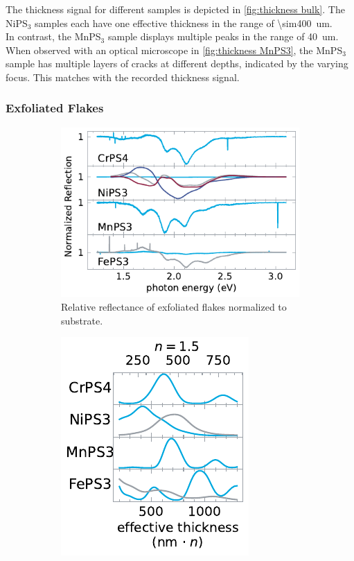 \documentclass[
	oneside,
	parskip=half,
	a4paper,
]{scrbook}
\begin{document}
The thickness signal for  different samples is depicted in \autoref{fig:thickness bulk}.
The NiPS$_3$ samples each have one effective thickness in the range of \SI{\sim400}{um}.\\
In contrast, the MnPS$_3$ sample displays multiple peaks in the range of \SI{40}{um}.
When observed with an optical microscope in \autoref{fig:thickness MnPS3}, the MnPS$_3$ sample has multiple layers of cracks at different depths, indicated by the varying focus.
This matches with the recorded thickness signal.

\subsubsection*{Exfoliated Flakes}
\begin{figure}
	\centering
	\begin{subfigure}[c]{3.5in}
		\centering
		\includegraphics{../figures/2024-04-10 normalized reflection spectra.pdf}
		\caption{Relative reflectance of exfoliated flakes normalized to substrate.}
		\label{fig:reflection flakes}
	\end{subfigure}
	\begin{subfigure}[c]{2in}
		\centering
		\includegraphics{../figures/2024-03-14 thickness flakes.pdf}

\end{subfigure}
\end{figure}
\end{document}

